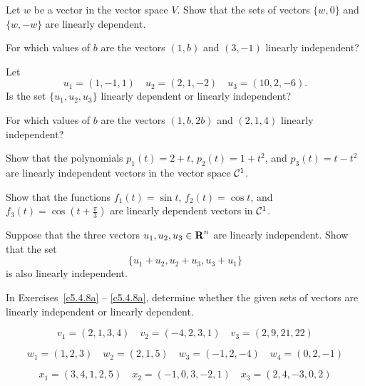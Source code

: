 \documentclass{ximera}
\begin{document}
\EXER

\TEXER

\begin{exercise} \label{c5.4.1}
Let $w$ be a vector in the vector space $V$.  Show that the sets of vectors
$\{w,0\}$ and $\{w,-w\}$ are linearly dependent.
\end{exercise}

\begin{exercise} \label{c5.4.2}
For which values of $b$ are the vectors $(1,b)$ and $(3,-1)$
linearly independent?
\end{exercise}

\begin{exercise} \label{c5.4.3}
Let
\[
u_1=(1,-1,1) \quad u_2=(2,1,-2) \quad u_3 = (10,2,-6).
\]
Is the set $\{u_1,u_2,u_3\}$ linearly dependent or linearly independent?
\end{exercise}


\begin{exercise} \label{c5.4.4}
For which values of $b$ are the vectors $(1,b,2b)$ and $(2,1,4)$
linearly independent?
\end{exercise}

\begin{exercise} \label{c5.4.5}
Show that the polynomials $p_1(t) = 2+t$, $p_2(t) = 1+t^2$, and
$p_3(t) = t-t^2$ are linearly independent vectors in the vector
space ${\cal C}^1$.
\end{exercise}

\begin{exercise} \label{c5.4.6}
Show that the functions $f_1(t) = \sin t$, $f_2(t)=\cos t$, and
$f_3(t)=\cos\left(t+\frac{\pi}{3}\right)$ are linearly dependent
vectors in ${\cal C}^1$.
\end{exercise}

\begin{exercise} \label{c5.4.7}
Suppose that the three vectors $u_1,u_2,u_3\in\mbox{$\bf{R}$}^n$ are linearly
independent.  Show that the set
\[
\{u_1+u_2, u_2+u_3,u_3+u_1\}
\]
is also linearly independent.
\end{exercise}

\CEXER

\noindent In Exercises~\ref{c5.4.8a} -- \ref{c5.4.8a}, determine whether
the given sets of vectors are linearly independent or linearly dependent.
\begin{exercise} \label{c5.4.8a}
\begin{equation*}
v_1 = (2,1,3,4) \quad v_2 = (-4,2,3,1) \quad v_3 = (2,9,21,22)
\end{equation*}
\end{exercise}
\begin{exercise} \label{c5.4.8b}
\begin{equation*}
w_1 = (1,2,3)\quad w_2 = (2,1,5) \quad w_3 = (-1,2,-4)
\quad w_4 = (0,2,-1)
\end{equation*}
\end{exercise}
\begin{exercise} \label{c5.4.8c}
\begin{equation*}
x_1 = (3,4,1,2,5) \quad x_2 = (-1,0,3,-2,1)\quad x_3 = (2,4,-3,0,2)
\end{equation*}
\end{exercise}
\end{document}
